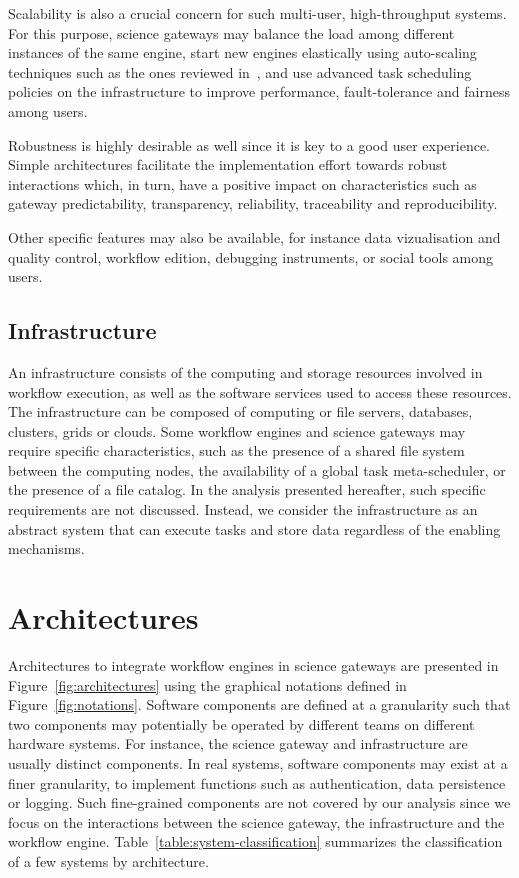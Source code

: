 \documentclass[preprint,3p,twocolumn]{elsarticle}
\newcommand{\correction}[1]{\color{blue}#1\color{black}\xspace}
\begin{document}
Scalability is also a crucial concern for such multi-user,
high-throughput systems. For this purpose, science gateways may
balance the load among different instances of the same engine, start
new engines elastically using auto-scaling techniques such as the ones
reviewed in~\cite{lorido2012auto}, and use advanced task scheduling
policies on the infrastructure to improve performance, fault-tolerance
and fairness among users.

Robustness is highly desirable as well since it is key to a
good user experience. Simple architectures facilitate the
implementation effort towards robust interactions which, in turn, have
a positive impact on characteristics such as gateway predictability,
transparency, reliability, traceability and
reproducibility. 

Other specific features may also be available, for instance
data vizualisation and quality control, workflow edition, debugging
instruments, or social tools among users. 

\subsection{Infrastructure}

An infrastructure consists of the computing and storage
resources involved in workflow execution, as well as the software
services used to access these resources. The infrastructure can be
composed of computing or file servers, databases, clusters, grids or
clouds. Some workflow engines and science gateways may require specific
characteristics, such as the presence of a shared file system between
the computing nodes, the availability of a global task meta-scheduler, or
the presence of a file catalog. In the analysis presented hereafter,
such specific requirements are not discussed. Instead, we consider the
infrastructure as an abstract system that can execute tasks and store
data regardless of the enabling mechanisms.

\section{Architectures}
\label{sec:architectures}


Architectures to integrate workflow engines in science gateways are
presented in Figure~\ref{fig:architectures} using the graphical
notations defined in Figure~\ref{fig:notations}. \correction{Software
  components are defined at a granularity such that two components may
  potentially be operated by different teams on different hardware
  systems. For instance, the science gateway and infrastructure are
  usually distinct components. In real systems, software components
  may exist at a finer granularity, to implement functions such as
  authentication, data persistence or logging. Such fine-grained
  components are not covered by our analysis since we focus on the
  interactions between the science gateway, the infrastructure and the
  workflow engine.}  Table~\ref{table:system-classification}
summarizes the classification of a few systems by architecture.
\end{document}
